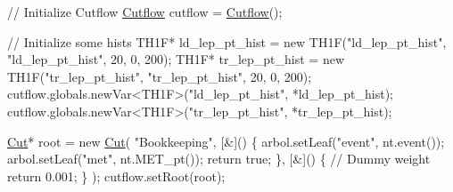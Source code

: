 \begin{DoxyEnumerate}
\begin{DoxyCode}
    \textcolor{comment}{// Initialize Cutflow}
    \hyperlink{classCutflow}{Cutflow} cutflow = \hyperlink{classCutflow}{Cutflow}();

    \textcolor{comment}{// Initialize some hists}
    TH1F* ld\_lep\_pt\_hist = \textcolor{keyword}{new} TH1F(\textcolor{stringliteral}{"ld\_lep\_pt\_hist"}, \textcolor{stringliteral}{"ld\_lep\_pt\_hist"}, 20, 0, 200);
    TH1F* tr\_lep\_pt\_hist = \textcolor{keyword}{new} TH1F(\textcolor{stringliteral}{"tr\_lep\_pt\_hist"}, \textcolor{stringliteral}{"tr\_lep\_pt\_hist"}, 20, 0, 200);
    cutflow.globals.newVar<TH1F>(\textcolor{stringliteral}{"ld\_lep\_pt\_hist"}, *ld\_lep\_pt\_hist);
    cutflow.globals.newVar<TH1F>(\textcolor{stringliteral}{"tr\_lep\_pt\_hist"}, *tr\_lep\_pt\_hist);

    \hyperlink{classCut}{Cut}* root = \textcolor{keyword}{new} \hyperlink{classCut}{Cut}(
        \textcolor{stringliteral}{"Bookkeeping"},
        [&]()
        \{
            arbol.setLeaf(\textcolor{stringliteral}{"event"}, nt.event());
            arbol.setLeaf(\textcolor{stringliteral}{"met"}, nt.MET\_pt());
            \textcolor{keywordflow}{return} \textcolor{keyword}{true};
        \},
        [&]()
        \{
            \textcolor{comment}{// Dummy weight}
            \textcolor{keywordflow}{return} 0.001;
        \}
    );
    cutflow.setRoot(root);


\end{DoxyCode}
\end{DoxyEnumerate}
